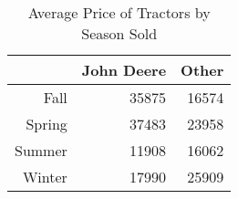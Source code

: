 \begin{table}[ht]
\centering
\begin{tabular}{rrr}
  \hline
 & John Deere & Other \\ 
  \hline
Fall & 35875 & 16574 \\ 
  Spring & 37483 & 23958 \\ 
  Summer & 11908 & 16062 \\ 
  Winter & 17990 & 25909 \\ 
   \hline
\end{tabular}
\caption{Average Price of Tractors by Season Sold} 
\label{tab:avg_price_by_season_sold}
\end{table}
